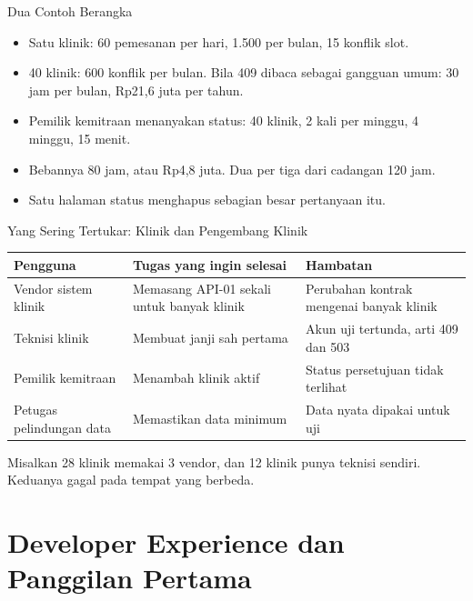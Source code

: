 \documentclass[aspectratio=169, table, 12pt]{beamer}
\begin{document}
\begin{frame}{{\Large Dua Contoh Berangka}}
  \vspace{8pt}
  \begin{itemize}
    \item Satu klinik: 60 pemesanan per hari, 1.500 per bulan, 15 konflik slot.
    \item 40 klinik: 600 konflik per bulan. Bila 409 dibaca sebagai gangguan umum: 30 jam per bulan, Rp21,6 juta per tahun.
    \item Pemilik kemitraan menanyakan status: 40 klinik, 2 kali per minggu, 4 minggu, 15 menit.
    \item Bebannya 80 jam, atau Rp4,8 juta. Dua per tiga dari cadangan 120 jam.
    \item Satu halaman status menghapus sebagian besar pertanyaan itu.
  \end{itemize}
\end{frame}

\begin{frame}{{\Large Yang Sering Tertukar: Klinik dan Pengembang Klinik}}
  \footnotesize
  \begin{tabularx}{\textwidth}{>{\raggedright\arraybackslash}p{2.9cm} >{\raggedright\arraybackslash}X >{\raggedright\arraybackslash}X}
    \hline
    \textbf{Pengguna} & \textbf{Tugas yang ingin selesai} & \textbf{Hambatan} \\ \hline
    Vendor sistem klinik & Memasang API-01 sekali untuk banyak klinik & Perubahan kontrak mengenai banyak klinik \\ \hline
    Teknisi klinik & Membuat janji sah pertama & Akun uji tertunda, arti 409 dan 503 \\ \hline
    Pemilik kemitraan & Menambah klinik aktif & Status persetujuan tidak terlihat \\ \hline
    Petugas pelindungan data & Memastikan data minimum & Data nyata dipakai untuk uji \\ \hline
  \end{tabularx}

  \vspace{8pt}
  \small Misalkan 28 klinik memakai 3 vendor, dan 12 klinik punya teknisi sendiri. Keduanya gagal pada tempat yang berbeda.
\end{frame}

\section{Developer Experience dan Panggilan Pertama}
\end{document}
